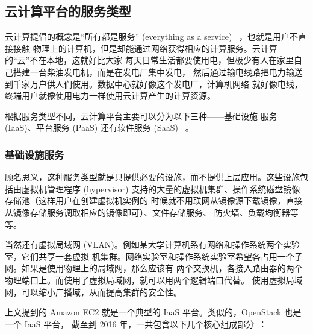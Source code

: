\subsection{云计算平台的服务类型}

云计算提倡的概念是“所有都是服务”
 (everything as a service) ~\cite{cloud-and-openstack}，也就是用户不直接接触
物理上的计算机，但是却能通过网络获得相应的计算服务。云计算的“云”不在本地，这就好比大家
每天日常生活都要使用电，但极少有人在家里自己搭建一台柴油发电机，而是在发电厂集中发电，
然后通过输电线路把电力输送到千家万户供人们使用。数据中心就好像这个发电厂，计算机网络
就好像电线，终端用户就像使用电力一样使用云计算产生的计算资源。

根据服务类型不同，云计算平台主要可以分为以下三种——基础设施
服务 (IaaS)、平台服务 (PaaS) 还有软件服务 (SaaS) ~\cite{types-of-cloud}。

\subsubsection{基础设施服务}

顾名思义，这种服务类型就是只提供必要的设施，而不提供上层应用。这些设施包括由虚拟机管理程序
 (hypervisor) 支持的大量的虚拟机集群、操作系统磁盘镜像存储池（这样用户在创建虚拟机实例的
时候就不用联网从镜像源下载镜像，直接从镜像存储服务调取相应的镜像即可）、文件存储服务、
防火墙、负载均衡器等等。

当然还有虚拟局域网 (VLAN)。例如某大学计算机系有网络和操作系统两个实验室，它们共享一套虚拟
机集群。网络实验室和操作系统实验室希望各占用一个子网。如果是使用物理上的局域网，那么应该有
两个交换机，各接入路由器的两个物理端口上。而使用了虚拟局域网，就可以用两个逻辑端口代替。
使用虚拟局域网，可以缩小广播域，从而提高集群的安全性。

上文提到的 Amazon EC2 就是一个典型的 IaaS 平台。类似的，OpenStack 也是一个 IaaS 平台，
截至到 2016 年，一共包含以下几个核心组成部分~\cite{openstack}：

